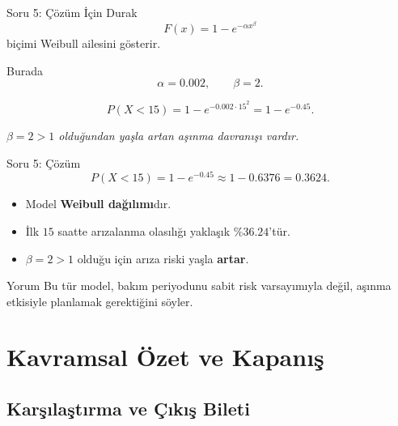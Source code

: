 \documentclass[light]{lutbeamer}
\begin{document}
\begin{frame}{Soru 5: Çözüm İçin Durak}
    \color{red!70!black}
    \small
    \[
    F(x)=1-e^{-\alpha x^\beta}
    \]
    biçimi Weibull ailesini gösterir.

    Burada
    \[
    \alpha=0.002, \qquad \beta=2.
    \]

    \[
    P(X<15)=1-e^{-0.002\cdot 15^2}=1-e^{-0.45}.
    \]

    \begin{center}
        \textit{\(\beta=2>1\) olduğundan yaşla artan aşınma davranışı vardır.}
    \end{center}
\end{frame}

\begin{frame}{Soru 5: Çözüm}
    \small
    \[
    P(X<15)=1-e^{-0.45}\approx 1-0.6376=0.3624.
    \]

    \begin{itemize}
        \item[(a)] Model \textbf{Weibull dağılımı}dır.
        \item[(b)] İlk \(15\) saatte arızalanma olasılığı yaklaşık \(\%36.24\)'tür.
        \item[(c)] \(\beta=2>1\) olduğu için arıza riski yaşla \textbf{artar}.
    \end{itemize}

    \begin{exampleblock}{Yorum}
        Bu tür model, bakım periyodunu sabit risk varsayımıyla değil, aşınma etkisiyle planlamak gerektiğini söyler.
    \end{exampleblock}
\end{frame}

\section{Kavramsal Özet ve Kapanış}
\subsection{Karşılaştırma ve Çıkış Bileti}
\end{document}
